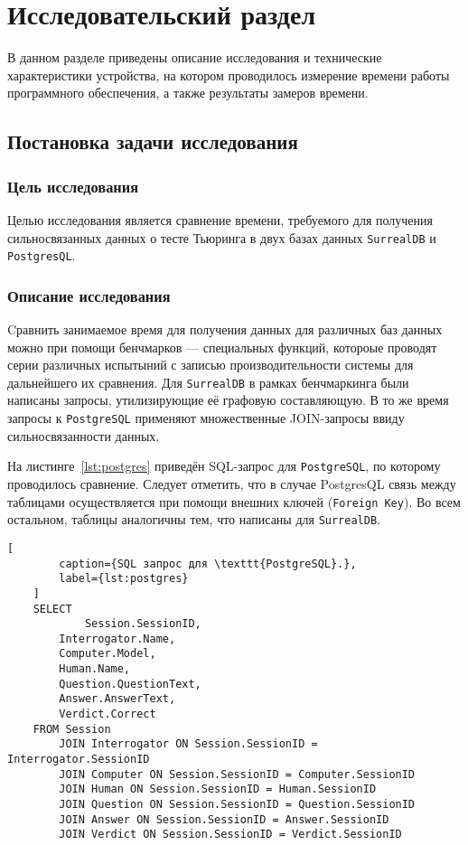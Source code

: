\section{Исследовательский раздел}

В данном разделе приведены описание исследования и технические характеристики устройства, на котором проводилось измерение времени работы программного обеспечения, а также результаты замеров времени.

\subsection{Постановка задачи исследования}

\subsubsection{Цель исследования}

Целью исследования является сравнение времени, требуемого для получения сильносвязанных данных о тесте Тьюринга в двух базах данных \texttt{SurrealDB} и \texttt{PostgresQL}.

\subsubsection{Описание исследования}
Cравнить занимаемое время для получения данных для различных баз данных можно при помощи бенчмарков --- специальных функций, котороые проводят серии различных испытыний с записью производительности системы для дальнейшего их сравнения.
Для \texttt{SurrealDB} в рамках бенчмаркинга были написаны запросы, утилизирующие её графовую составляющую.
В то же время запросы к \texttt{PostgreSQL} применяют множественные JOIN-запросы ввиду сильносвязанности данных.

На листинге~\ref{lst:postgres} приведён SQL-запрос для \texttt{PostgreSQL}, по которому проводилось сравнение. 
Следует отметить, что в случае PostgresQL связь между таблицами осуществляется при помощи внешних ключей (\texttt{Foreign Key}). 
Во всем остальном, таблицы аналогичны тем, что написаны для \texttt{SurrealDB}.

\clearpage

\begin{lstlisting}[
		caption={SQL запрос для \texttt{PostgreSQL}.},
		label={lst:postgres}
	]
    SELECT 
    		Session.SessionID,
        Interrogator.Name, 
        Computer.Model, 
        Human.Name, 
        Question.QuestionText,
        Answer.AnswerText,
        Verdict.Correct
    FROM Session
        JOIN Interrogator ON Session.SessionID = Interrogator.SessionID
        JOIN Computer ON Session.SessionID = Computer.SessionID
        JOIN Human ON Session.SessionID = Human.SessionID
        JOIN Question ON Session.SessionID = Question.SessionID
        JOIN Answer ON Session.SessionID = Answer.SessionID
        JOIN Verdict ON Session.SessionID = Verdict.SessionID
\end{lstlisting}

